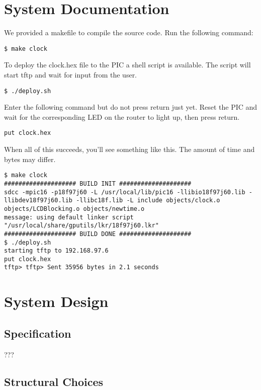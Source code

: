 \documentclass[11pt]{article}
\begin{document}
\section{System Documentation}
We provided a makefile to compile the source code. Run the following command:
\begin{lstlisting}
$ make clock 
\end{lstlisting}
To deploy the clock.hex file to the PIC a shell script is available. The script will start tftp and wait for input from the user. 
\begin{lstlisting}
$ ./deploy.sh 
\end{lstlisting}
Enter the following command but do not press return just yet. Reset the PIC and wait for the corresponding LED on the router to light up, then press return.
\begin{lstlisting}
put clock.hex
\end{lstlisting}
When all of this succeeds, you'll see something like this. The amount of time and bytes may differ.
\begin{lstlisting}
$ make clock 
#################### BUILD INIT ####################
sdcc -mpic16 -p18f97j60 -L /usr/local/lib/pic16 -llibio18f97j60.lib -llibdev18f97j60.lib -llibc18f.lib -L include objects/clock.o objects/LCDBlocking.o objects/newtime.o
message: using default linker script "/usr/local/share/gputils/lkr/18f97j60.lkr"
#################### BUILD DONE ####################
$ ./deploy.sh 
starting tftp to 192.168.97.6
put clock.hex
tftp> tftp> Sent 35956 bytes in 2.1 seconds
\end{lstlisting}

\section{System Design}

\subsection{Specification}
???

\subsection{Structural Choices}
\end{document}
